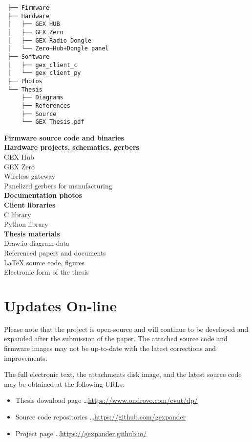 \begin{minipage}[t]{.45\textwidth}

\begin{Verbatim}
 ├── Firmware
 ├── Hardware
 │   ├── GEX HUB
 │   ├── GEX Zero
 │   ├── GEX Radio Dongle
 │   └── Zero+Hub+Dongle panel
 ├── Software
 │   ├── gex_client_c
 │   └── gex_client_py
 ├── Photos
 └── Thesis
     ├── Diagrams
     ├── References
     ├── Source
     └── GEX_Thesis.pdf
\end{Verbatim}
\end{minipage}
\begin{minipage}[t]{.55\textwidth}
\textbf{Firmware source code and binaries} \\
\textbf{Hardware projects, schematics, gerbers} \\
\null{\quad}GEX Hub\\
\null{\quad}GEX Zero\\
\null{\quad}Wireless gateway\\
\null{\quad}Panelized gerbers for manufacturing\\
\textbf{Documentation photos} \\
\textbf{Client libraries} \\
\null{\quad}C library\\
\null{\quad}Python library\\
\textbf{Thesis materials} \\
\null{\quad}Draw.io diagram data \\
\null{\quad}Referenced papers and documents \\
\null{\quad}\LaTeX\xspace source code, figures \\
\null{\quad}Electronic form of the thesis
\end{minipage}

\section*{Updates On-line}
Please note that the project is open-source and will continue to be developed and expanded after the submission of the paper. The attached source code and firmware images may not be up-to-date with the latest corrections and improvements.


\noindent
The full electronic text, the attachments disk image, and the latest source code may be obtained at the following URLs:

\begin{itemize}
\item Thesis download page \dots \url{https://www.ondrovo.com/cvut/dp/}
\item Source code repositories \dots \url{https://github.com/gexpander}
\item Project page \dots \url{https://gexpander.github.io/}
\end{itemize}

